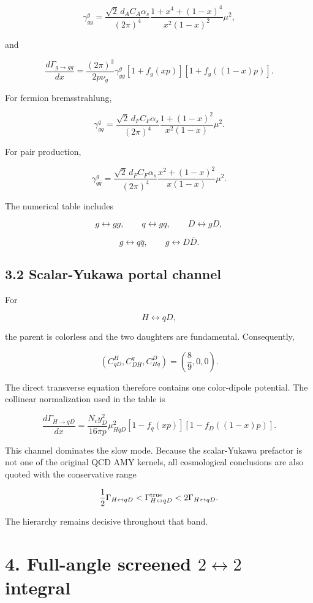 \documentclass[
  10pt,
]{article}
\begin{document}
\[
\gamma_{gg}^{g}
=
\frac{\sqrt2\,d_A C_A\alpha_s}{(2\pi)^4}
\frac{1+x^4+(1-x)^4}{x^2(1-x)^2}
\mu^2,
\]

and

\[
\frac{d\Gamma_{g\rightarrow gg}}{dx}
=
\frac{(2\pi)^3}{2p\nu_g}
\gamma_{gg}^{g}
[1+f_g(xp)]
[1+f_g((1-x)p)].
\]

For fermion bremsstrahlung,

\[
\gamma_{gq}^{q}
=
\frac{\sqrt2\,d_F C_F\alpha_s}{(2\pi)^4}
\frac{1+(1-x)^2}{x^2(1-x)}
\mu^2.
\]

For pair production,

\[
\gamma_{q\bar q}^{g}
=
\frac{\sqrt2\,d_F C_F\alpha_s}{(2\pi)^4}
\frac{x^2+(1-x)^2}{x(1-x)}
\mu^2.
\]

The numerical table includes

\[
g\leftrightarrow gg,
\qquad
q\leftrightarrow gq,
\qquad
D\leftrightarrow gD,
\]

\[
g\leftrightarrow q\bar q,
\qquad
g\leftrightarrow D\bar D.
\]

\subsection{3.2 Scalar-Yukawa portal
channel}\label{scalar-yukawa-portal-channel}

For

\[
H\leftrightarrow qD,
\]

the parent is colorless and the two daughters are fundamental.
Consequently,

\[
\left(
C_{qD}^{H},
C_{DH}^{q},
C_{Hq}^{D}
\right)
=
\left(
\frac89,0,0
\right).
\]

The direct transverse equation therefore contains one color-dipole
potential. The collinear normalization used in the table is

\[
\frac{d\Gamma_{H\rightarrow qD}}{dx}
=
\frac{N_cy_D^2}{16\pi p}
\mu_{HqD}^2
[1-f_q(xp)]
[1-f_D((1-x)p)].
\]

This channel dominates the slow mode. Because the scalar-Yukawa
prefactor is not one of the original QCD AMY kernels, all cosmological
conclusions are also quoted with the conservative range

\[
\frac12\Gamma_{H\leftrightarrow qD}
<
\Gamma_{H\leftrightarrow qD}^{\rm true}
<
2\Gamma_{H\leftrightarrow qD}.
\]

The hierarchy remains decisive throughout that band.

\section{\texorpdfstring{4. Full-angle screened \(2\leftrightarrow2\)
integral}{4. Full-angle screened 2\textbackslash leftrightarrow2 integral}}\label{full-angle-screened-2leftrightarrow2-integral}
\end{document}
